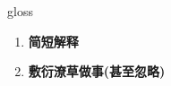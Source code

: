 
\begin{frame}
{\huge gloss}
\begin{center}
\begin{enumerate}\Large
  \item \textbf{简短解释}
  \item \textbf{敷衍潦草做事(甚至忽略)}
\end{enumerate}
\end{center}
\end{frame}
